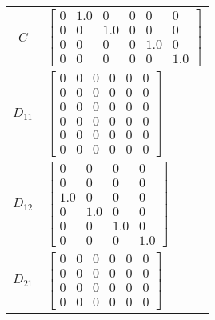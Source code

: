 \begin{tabular}{cl}
   $C$    & $\left[\begin{matrix}0 & 1.0 & 0 & 0 & 0 & 0\\0 & 0 & 1.0 & 0 & 0 & 0\\0 & 0 & 0 & 0 & 1.0 & 0\\0 & 0 & 0 & 0 & 0 & 1.0\end{matrix}\right]$                                                                                           \\
 $D_{11}$ & $\left[\begin{matrix}0 & 0 & 0 & 0 & 0 & 0\\0 & 0 & 0 & 0 & 0 & 0\\0 & 0 & 0 & 0 & 0 & 0\\0 & 0 & 0 & 0 & 0 & 0\\0 & 0 & 0 & 0 & 0 & 0\\0 & 0 & 0 & 0 & 0 & 0\end{matrix}\right]$                                                     \\
 $D_{12}$ & $\left[\begin{matrix}0 & 0 & 0 & 0\\0 & 0 & 0 & 0\\1.0 & 0 & 0 & 0\\0 & 1.0 & 0 & 0\\0 & 0 & 1.0 & 0\\0 & 0 & 0 & 1.0\end{matrix}\right]$                                                                                             \\
 $D_{21}$ & $\left[\begin{matrix}0 & 0 & 0 & 0 & 0 & 0\\0 & 0 & 0 & 0 & 0 & 0\\0 & 0 & 0 & 0 & 0 & 0\\0 & 0 & 0 & 0 & 0 & 0\end{matrix}\right]$                                                                                                   \\
\hline
\end{tabular}